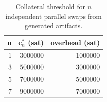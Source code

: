 \begin{table}[t]
\caption{Collateral threshold for $n$ independent parallel swaps from generated artifacts.}
\label{tab:pub_parallel_swaps}
\centering
\begin{tabular}{rrr}
\toprule
n & c$_n^*$ (sat) & overhead (sat) \\ 
\midrule
1 & 3000000 & 1000000 \\ 
3 & 5000000 & 3000000 \\ 
5 & 7000000 & 5000000 \\ 
7 & 9000000 & 7000000 \\ 
\bottomrule
\end{tabular}
\end{table}
